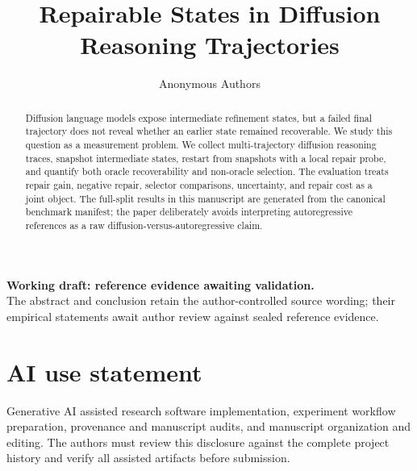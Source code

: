 \documentclass{article}
\title{Repairable States in Diffusion Reasoning Trajectories}
\author{Anonymous Authors}
\date{}
\begin{document}
\maketitle

\begin{abstract}
Diffusion language models expose intermediate refinement states, but a failed final trajectory does not reveal whether an earlier state remained recoverable. We study this question as a measurement problem. We collect multi-trajectory diffusion reasoning traces, snapshot intermediate states, restart from snapshots with a local repair probe, and quantify both oracle recoverability and non-oracle selection. The evaluation treats repair gain, negative repair, selector comparisons, uncertainty, and repair cost as a joint object. The full-split results in this manuscript are generated from the canonical benchmark manifest; the paper deliberately avoids interpreting autoregressive references as a raw diffusion-versus-autoregressive claim.
\end{abstract}

\begin{center}
\textbf{Working draft: reference evidence awaiting validation.}\\
The abstract and conclusion retain the author-controlled source wording;
their empirical statements await author review against sealed reference evidence.
\end{center}










\label{main-text-end}
\clearpage
\section*{AI use statement}
Generative AI assisted research software implementation, experiment workflow
preparation, provenance and manuscript audits, and manuscript organization and
editing. The authors must review this disclosure against the complete project
history and verify all assisted artifacts before submission.




\clearpage
\appendix

\end{document}

